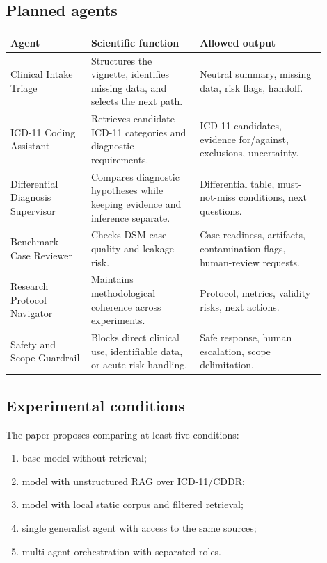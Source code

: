 \documentclass[11pt,a4paper]{article}
\begin{document}
\subsection{Planned agents}
\begin{longtable}{p{0.23\linewidth}p{0.31\linewidth}p{0.36\linewidth}}
\toprule
\textbf{Agent} & \textbf{Scientific function} & \textbf{Allowed output}\\
\midrule
Clinical Intake Triage & Structures the vignette, identifies missing data, and selects the next path. & Neutral summary, missing data, risk flags, handoff.\\
ICD-11 Coding Assistant & Retrieves candidate ICD-11 categories and diagnostic requirements. & ICD-11 candidates, evidence for/against, exclusions, uncertainty.\\
Differential Diagnosis Supervisor & Compares diagnostic hypotheses while keeping evidence and inference separate. & Differential table, must-not-miss conditions, next questions.\\
Benchmark Case Reviewer & Checks DSM case quality and leakage risk. & Case readiness, artifacts, contamination flags, human-review requests.\\
Research Protocol Navigator & Maintains methodological coherence across experiments. & Protocol, metrics, validity risks, next actions.\\
Safety and Scope Guardrail & Blocks direct clinical use, identifiable data, or acute-risk handling. & Safe response, human escalation, scope delimitation.\\
\bottomrule
\end{longtable}

\subsection{Experimental conditions}
The paper proposes comparing at least five conditions:
\begin{enumerate}
  \item base model without retrieval;
  \item model with unstructured RAG over ICD-11/CDDR;
  \item model with local static corpus and filtered retrieval;
  \item single generalist agent with access to the same sources;
  \item multi-agent orchestration with separated roles.
\end{enumerate}
\end{document}
